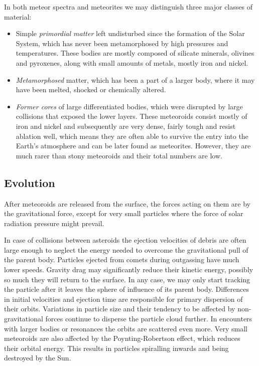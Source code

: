             In both meteor spectra and meteorites we may distinguish three major classes of material:
            \begin{itemize}
                \item Simple \emph{primordial matter} left undisturbed since the formation of the Solar System,
                    which has never been metamorphosed by high pressures and temperatures.
                    These bodies are mostly composed of silicate minerals, olivines and pyroxenes,
                    along with small amounts of metals, mostly iron and nickel.
                \item \emph{Metamorphosed} matter, which has been a part of a larger body,
                    where it may have been melted, shocked or chemically altered.
                \item \emph{Former cores} of large differentiated bodies, which were disrupted by large collisions
                    that exposed the lower layers.
                    These meteoroids consist mostly of iron and nickel and subsequently are very dense,
                    fairly tough and resist ablation well, which means they are often able to
                    survive the entry into the Earth's atmosphere and can be later found as meteorites.
                    However, they are much rarer than stony meteoroids and their total numbers are low.
            \end{itemize}

        \subsection{Evolution} \label{iamf}
            After meteoroids are released from the surface, the forces acting on them are
            by the gravitational force, except for very small particles where the force of solar radiation pressure
            might prevail.

            In case of collisions between asteroids the ejection velocities of debris are often
            large enough to neglect the energy needed to overcome the gravitational pull of the parent body.
            Particles ejected from comets during outgassing have much lower speeds.
            Gravity drag may significantly reduce their kinetic energy, possibly so much they will return to the surface.
            In any case, we may only start tracking the particle after it leaves the sphere of influence of its parent body.
            Differences in initial velocities and ejection time are responsible
            for primary dispersion of their orbits. Variations in particle size and their tendency to be affected
            by non-gravitational forces continue to disperse the particle cloud further.
            In encounters with larger bodies or resonances the orbits are scattered even more.
            Very small meteoroids are also affected by the Poynting-Robertson effect, which
            reduces their orbital energy. This results in particles spiralling inwards and being destroyed by the Sun.

